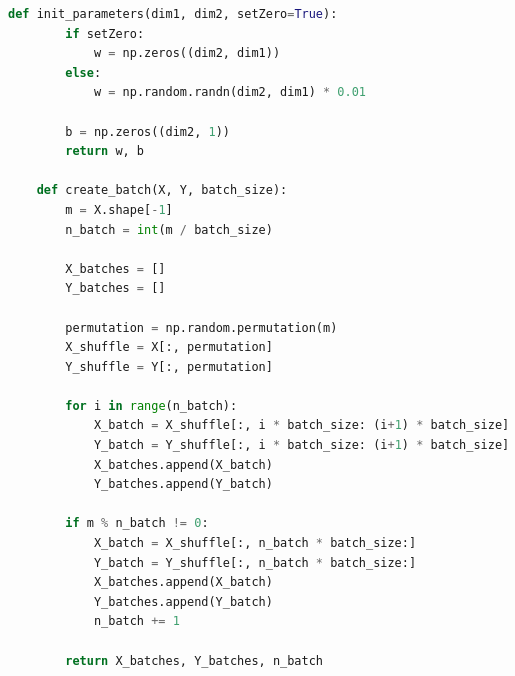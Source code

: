 \documentclass{article}
\begin{document}
\begin{lstlisting}[language=Python,breaklines]
	def init_parameters(dim1, dim2, setZero=True):
	    if setZero:
	        w = np.zeros((dim2, dim1))
	    else:
	        w = np.random.randn(dim2, dim1) * 0.01
	
	    b = np.zeros((dim2, 1))
	    return w, b
	
	def create_batch(X, Y, batch_size):
	    m = X.shape[-1]
	    n_batch = int(m / batch_size)
	
	    X_batches = []
	    Y_batches = []
	
	    permutation = np.random.permutation(m)
	    X_shuffle = X[:, permutation]
	    Y_shuffle = Y[:, permutation]
	
	    for i in range(n_batch):
	        X_batch = X_shuffle[:, i * batch_size: (i+1) * batch_size]
	        Y_batch = Y_shuffle[:, i * batch_size: (i+1) * batch_size]
	        X_batches.append(X_batch)
	        Y_batches.append(Y_batch)
	
	    if m % n_batch != 0:
	        X_batch = X_shuffle[:, n_batch * batch_size:]
	        Y_batch = Y_shuffle[:, n_batch * batch_size:]
	        X_batches.append(X_batch)
	        Y_batches.append(Y_batch)
	        n_batch += 1
	
	    return X_batches, Y_batches, n_batch
	
\end{lstlisting}
\end{document}
